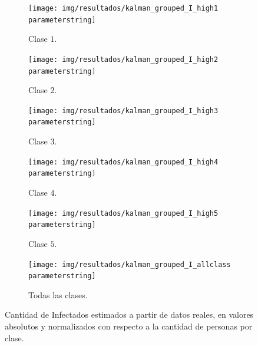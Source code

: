\begin{figure}[!h]
     \centering
     \begin{subfigure}[b]{0.47\textwidth}
         \centering
         \texttt{[image: img/resultados/kalman\_grouped\_I\_high1\\parameterstring]}
         \caption{Clase \(1\).}
     \end{subfigure}
     \hfill
     \begin{subfigure}[b]{.47\textwidth}
         \centering
         \texttt{[image: img/resultados/kalman\_grouped\_I\_high2\\parameterstring]}
         \caption{Clase \(2\).}
     \end{subfigure}
     \hfill
     \begin{subfigure}[b]{.47\textwidth}
         \centering
         \texttt{[image: img/resultados/kalman\_grouped\_I\_high3\\parameterstring]}
         \caption{Clase \(3\).}
     \end{subfigure}
     \hfill
     \begin{subfigure}[b]{.47\textwidth}
         \centering
         \texttt{[image: img/resultados/kalman\_grouped\_I\_high4\\parameterstring]}
         \caption{Clase \(4\).}
     \end{subfigure}
     \hfill
     \begin{subfigure}[b]{.47\textwidth}
         \centering
         \texttt{[image: img/resultados/kalman\_grouped\_I\_high5\\parameterstring]}
         \caption{Clase \(5\).}
     \end{subfigure}
     \hfill
     \begin{subfigure}[b]{.47\textwidth}
         \centering
         \texttt{[image: img/resultados/kalman\_grouped\_I\_allclass\\parameterstring]}
         \caption{Todas las clases.}
     \end{subfigure}
        \caption{Cantidad de Infectados estimados a partir de datos reales, en valores absolutos y normalizados con respecto a la cantidad de personas por clase.}
        \label{e-comp-high}
\end{figure}



